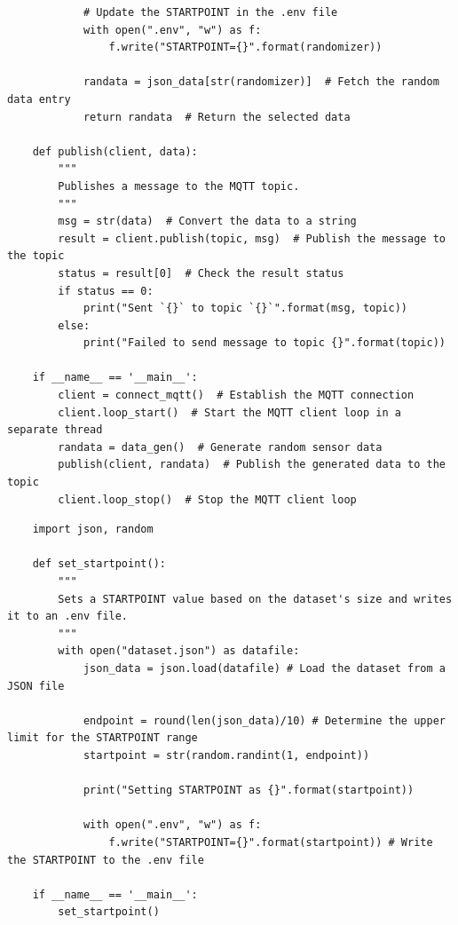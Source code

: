 \begin{verbatim}
            # Update the STARTPOINT in the .env file
            with open(".env", "w") as f:
                f.write("STARTPOINT={}".format(randomizer))

            randata = json_data[str(randomizer)]  # Fetch the random data entry
            return randata  # Return the selected data

    def publish(client, data):
        """
        Publishes a message to the MQTT topic.
        """
        msg = str(data)  # Convert the data to a string
        result = client.publish(topic, msg)  # Publish the message to the topic
        status = result[0]  # Check the result status
        if status == 0:
            print("Sent `{}` to topic `{}`".format(msg, topic))
        else:
            print("Failed to send message to topic {}".format(topic))        

    if __name__ == '__main__':
        client = connect_mqtt()  # Establish the MQTT connection
        client.loop_start()  # Start the MQTT client loop in a separate thread
        randata = data_gen()  # Generate random sensor data
        publish(client, randata)  # Publish the generated data to the topic
        client.loop_stop()  # Stop the MQTT client loop
\end{verbatim}

\begin{verbatim}
    import json, random

    def set_startpoint():
        """
        Sets a STARTPOINT value based on the dataset's size and writes it to an .env file.
        """
        with open("dataset.json") as datafile:
            json_data = json.load(datafile) # Load the dataset from a JSON file
            
            endpoint = round(len(json_data)/10) # Determine the upper limit for the STARTPOINT range
            startpoint = str(random.randint(1, endpoint))

            print("Setting STARTPOINT as {}".format(startpoint))

            with open(".env", "w") as f:
                f.write("STARTPOINT={}".format(startpoint)) # Write the STARTPOINT to the .env file

    if __name__ == '__main__':
        set_startpoint()
\end{verbatim}

